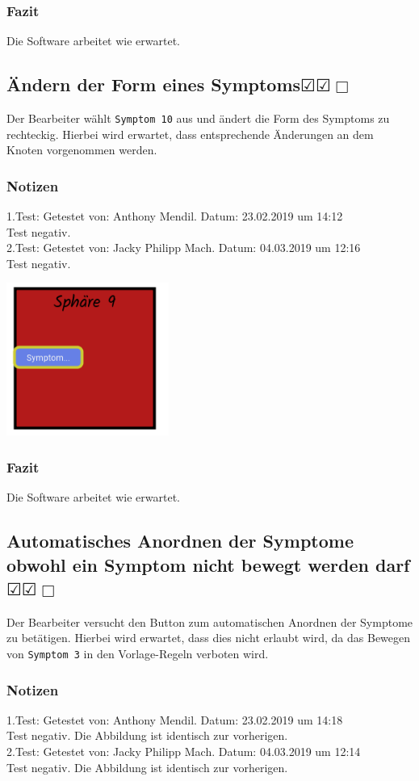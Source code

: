 \documentclass[enabledeprecatedfontcommands]{scrartcl}
\newcommand{\subsectiont}[2]{\subsection[#1]{#1{\normalsize\normalfont #2}}}
\newcommand{\leer}{$\Box$}
\newcommand{\ok}{$\CheckedBox$}
\begin{document}
\subsubsection{Fazit}
Die Software arbeitet wie erwartet.

\subsectiont{Ändern der Form eines Symptoms}{\dotfill\ok\ok\leer}
Der Bearbeiter wählt \texttt{Symptom 10} aus und ändert die Form des Symptoms zu rechteckig. Hierbei wird erwartet, dass entsprechende Änderungen an dem Knoten vorgenommen werden.
\subsubsection{Notizen}
1.Test: Getestet von: Anthony Mendil. Datum: 23.02.2019 um 14:12 \\
Test negativ.\\
2.Test: Getestet von: Jacky Philipp Mach. Datum: 04.03.2019 um 12:16 \\
Test negativ.
\begin{center}
\includegraphics[height=5cm]{2_27.PNG}
\end{center}
\subsubsection{Fazit}
Die Software arbeitet wie erwartet.

\subsectiont{Automatisches Anordnen der Symptome obwohl ein Symptom nicht bewegt werden darf}{\dotfill\ok\ok\leer}
Der Bearbeiter versucht den Button zum automatischen Anordnen der Symptome zu betätigen. Hierbei wird erwartet, dass dies nicht erlaubt wird, da das Bewegen von \texttt{Symptom 3} in den Vorlage-Regeln verboten wird. 
\subsubsection{Notizen}
1.Test: Getestet von: Anthony Mendil. Datum: 23.02.2019 um 14:18 \\
Test negativ. Die Abbildung ist identisch zur vorherigen. \\
2.Test: Getestet von: Jacky Philipp Mach. Datum: 04.03.2019 um 12:14 \\
Test negativ. Die Abbildung ist identisch zur vorherigen. 
\end{document}

